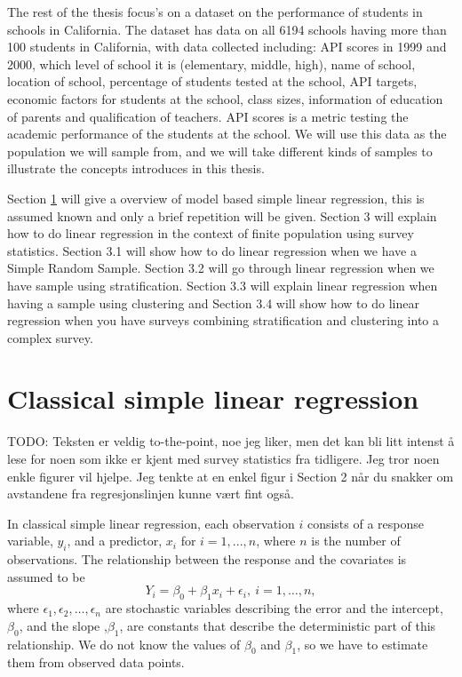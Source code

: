 \documentclass{article}
\begin{document}
The rest of the thesis focus's on a dataset on the performance of students in schools in
California. The dataset has data on all 6194 schools having more than 100
students in California, with data collected
including: API scores in 1999 and 2000, which level of school it is
(elementary, middle, high), name of school, location of school, percentage of
students tested at the school, API targets, economic factors for students at the
school, class sizes, information of education of parents and qualification of teachers.
API scores is a metric testing the academic performance of the students at the school.
We will use this data as the population we will sample from, and we will take
different kinds of samples to illustrate the concepts introduces in this thesis.

Section \ref{sec:modLinReg} will give a overview of model based simple
linear regression, this is assumed known and only a brief repetition will be given.
Section 3 will explain how to do linear regression in the context of finite
population using survey statistics. Section 3.1 will show how to do linear
regression when we have a Simple Random Sample. Section 3.2 will go through
linear regression when we have sample using stratification. Section 3.3 will
explain linear regression when having a sample using clustering and Section 3.4
will show how to do linear regression when you have surveys combining
stratification and clustering into a complex survey.



\section{Classical simple linear regression} \label{sec:modLinReg}

TODO: Teksten er veldig to-the-point, noe jeg liker, men det kan bli litt intenst å lese for noen som ikke er kjent med survey statistics fra tidligere. Jeg tror noen enkle figurer vil hjelpe. Jeg tenkte at en enkel figur i Section 2 når du snakker om avstandene fra regresjonslinjen kunne vært fint også.

In classical simple linear regression, each observation \(i\) consists of a
response variable, \(y_i\), and a predictor, \(x_i\) for \(i = 1, ..., n\), where \(n\) is the number of observations. The
relationship between the response and the covariates is assumed to be
\begin{equation*}
Y_i = \beta_0 + \beta_1 x_i + \epsilon_i,\ i = 1, \dots, n,
\end{equation*}
where \(\epsilon_1, \epsilon_2, \dots, \epsilon_n\) are stochastic variables
describing the error and the intercept, \(\beta_0\), and the slope ,\(\beta_1\),
are constants that describe the deterministic part of this relationship.
We do not know the values of \(\beta_0\) and \(\beta_1\), so we have to estimate
them from observed data points.
\end{document}

